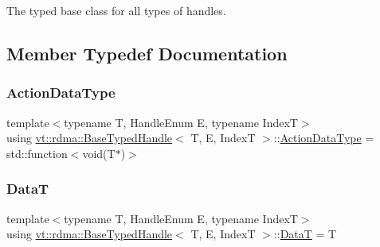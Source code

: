 The typed base class for all types of handles. 

\subsection{Member Typedef Documentation}
\mbox{\label{structvt_1_1rdma_1_1_base_typed_handle_a20c231fb671a38c3bb761d613dd42b3c}} 
\subsubsection{\texorpdfstring{Action\+Data\+Type}{ActionDataType}}
{\footnotesize\ttfamily template$<$typename T, Handle\+Enum E, typename IndexT$>$ \\
using \hyperlink{structvt_1_1rdma_1_1_base_typed_handle}{vt\+::rdma\+::\+Base\+Typed\+Handle}$<$ T, E, IndexT $>$\+::\hyperlink{structvt_1_1rdma_1_1_base_typed_handle_a20c231fb671a38c3bb761d613dd42b3c}{Action\+Data\+Type} =  std\+::function$<$void(T$\ast$)$>$}

\mbox{\label{structvt_1_1rdma_1_1_base_typed_handle_a442fed4e2898c2fc2b7e8686283efdde}} 
\subsubsection{\texorpdfstring{DataT}{DataT}}
{\footnotesize\ttfamily template$<$typename T, Handle\+Enum E, typename IndexT$>$ \\
using \hyperlink{structvt_1_1rdma_1_1_base_typed_handle}{vt\+::rdma\+::\+Base\+Typed\+Handle}$<$ T, E, IndexT $>$\+::\hyperlink{structvt_1_1rdma_1_1_base_typed_handle_a442fed4e2898c2fc2b7e8686283efdde}{DataT} =  T}

\mbox{\label{structvt_1_1rdma_1_1_base_typed_handle_aca839871dda1f44f8e59a451174b9a2a}} 
